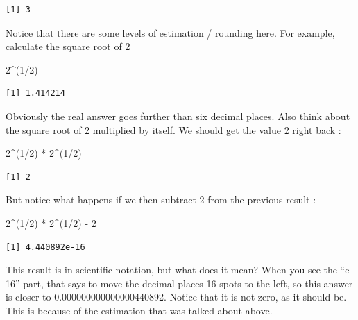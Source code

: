 \documentclass[
  letterpaper,
  DIV=11,
  numbers=noendperiod]{scrreprt}
\newenvironment{Shaded}{\begin{snugshade}}{\end{snugshade}}
\newcommand{\DecValTok}[1]{\textcolor[rgb]{0.68,0.00,0.00}{#1}}
\newcommand{\NormalTok}[1]{\textcolor[rgb]{0.00,0.23,0.31}{#1}}
\newcommand{\SpecialCharTok}[1]{\textcolor[rgb]{0.37,0.37,0.37}{#1}}
\begin{document}
\begin{verbatim}
[1] 3
\end{verbatim}

Notice that there are some levels of estimation / rounding here. For
example, calculate the square root of 2

\begin{Shaded}
\begin{Highlighting}[]
\DecValTok{2}\SpecialCharTok{\^{}}\NormalTok{(}\DecValTok{1}\SpecialCharTok{/}\DecValTok{2}\NormalTok{)}
\end{Highlighting}
\end{Shaded}

\begin{verbatim}
[1] 1.414214
\end{verbatim}

Obviously the real answer goes further than six decimal places. Also
think about the square root of 2 multiplied by itself. We should get the
value 2 right back :

\begin{Shaded}
\begin{Highlighting}[]
\DecValTok{2}\SpecialCharTok{\^{}}\NormalTok{(}\DecValTok{1}\SpecialCharTok{/}\DecValTok{2}\NormalTok{) }\SpecialCharTok{*} \DecValTok{2}\SpecialCharTok{\^{}}\NormalTok{(}\DecValTok{1}\SpecialCharTok{/}\DecValTok{2}\NormalTok{)}
\end{Highlighting}
\end{Shaded}

\begin{verbatim}
[1] 2
\end{verbatim}

But notice what happens if we then subtract 2 from the previous result :

\begin{Shaded}
\begin{Highlighting}[]
\DecValTok{2}\SpecialCharTok{\^{}}\NormalTok{(}\DecValTok{1}\SpecialCharTok{/}\DecValTok{2}\NormalTok{) }\SpecialCharTok{*} \DecValTok{2}\SpecialCharTok{\^{}}\NormalTok{(}\DecValTok{1}\SpecialCharTok{/}\DecValTok{2}\NormalTok{) }\SpecialCharTok{{-}} \DecValTok{2}
\end{Highlighting}
\end{Shaded}

\begin{verbatim}
[1] 4.440892e-16
\end{verbatim}

This result is in scientific notation, but what does it mean? When you
see the ``e-16'' part, that says to move the decimal places 16 spots to
the left, so this answer is closer to 0.000000000000000440892. Notice
that it is not zero, as it should be. This is because of the estimation
that was talked about above.
\end{document}

